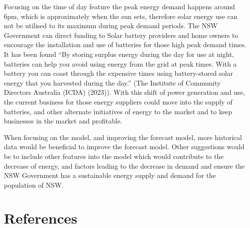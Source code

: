 \documentclass[mstat,12pt]{unswthesis}
\begin{document}
Focusing on the time of day feature the peak energy demand happens
around 6pm, which is approximately when the sun sets, therefore solar
energy use can not be utilised to its maximum during peak demand
periods. The NSW Government can direct funding to Solar battery
providers and home owners to encourage the installation and use of
batteries for those high peak demand times. It has been found ``By
storing surplus energy during the day for use at night, batteries can
help you avoid using energy from the grid at peak times. With a battery
you can coast through the expensive times using battery-stored solar
energy that you harvested during the day.'' (The Institute of Community
Directors Australia (ICDA) (2023)). With this shift of power generation
and use, the current business for those energy suppliers could move into
the supply of batteries, and other alternate initiatives of energy to
the market and to keep businesses in the market and profitable.

When focusing on the model, and improving the forecast model, more
historical data would be beneficial to improve the forecast model. Other
suggestions would be to include other features into the model which
would contribute to the decrease of energy, and factors leading to the
decrease in demand and ensure the NSW Government has a sustainable
energy supply and demand for the population of NSW.

\hypertarget{references}{%
\chapter*{References}\label{references}}
\end{document}
